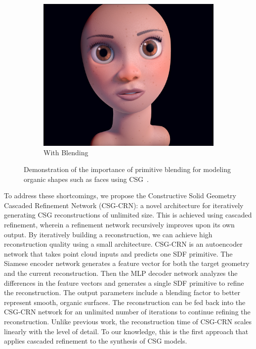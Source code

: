 \begin{figure}[!b]
\begin{subfigure}[t]{0.45\textwidth}
		\includegraphics[width=\textwidth]{Images/Face with blending}
		\caption{With Blending}
	\end{subfigure}
	\caption{Demonstration of the importance of primitive blending for modeling organic shapes such as faces using CSG~\cite{Quilez2013}.}
	\label{fig:primitive_blending}
\end{figure}

To address these shortcomings, we propose the Constructive Solid Geometry Cascaded Refinement Network (CSG-CRN): a novel architecture for iteratively generating CSG reconstructions of unlimited size. This is achieved using cascaded refinement, wherein a refinement network recursively improves upon its own output. By iteratively building a reconstruction, we can achieve high reconstruction quality using a small architecture. CSG-CRN is an autoencoder network that takes point cloud inputs and predicts one SDF primitive. The Siamese encoder network generates a feature vector for both the target geometry and the current reconstruction. Then the MLP decoder network analyzes the differences in the feature vectors and generates a single SDF primitive to refine the reconstruction. The output parameters include a blending factor to better represent smooth, organic surfaces. The reconstruction can be fed back into the CSG-CRN network for an unlimited number of iterations to continue refining the reconstruction. Unlike previous work, the reconstruction time of CSG-CRN scales linearly with the level of detail. To our knowledge, this is the first approach that applies cascaded refinement to the synthesis of CSG models.

